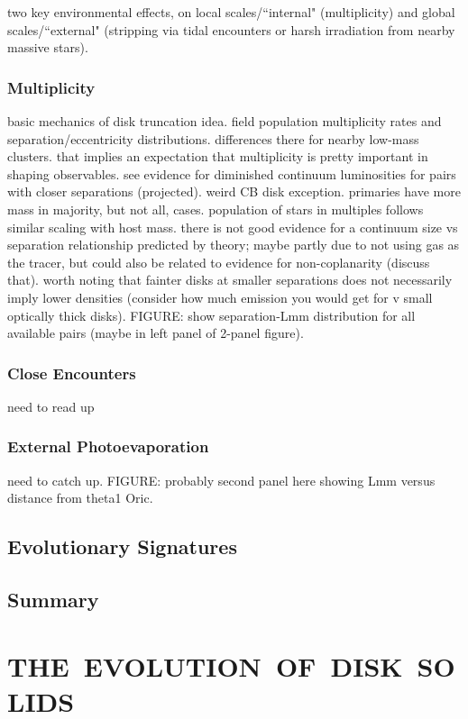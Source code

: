 \documentclass[a4paper]{ar-1col}
\begin{document}
two key environmental effects, on local scales/``internal" (multiplicity) and global scales/``external" (stripping via tidal encounters or harsh irradiation from nearby massive stars).  

\subsubsection{Multiplicity}
basic mechanics of disk truncation idea.  field population multiplicity rates and separation/eccentricity distributions.  differences there for nearby low-mass clusters.  that implies an expectation that multiplicity is pretty important in shaping observables.  see evidence for diminished continuum luminosities for pairs with closer separations (projected).  weird CB disk exception.  primaries have more mass in majority, but not all, cases.  population of stars in multiples follows similar scaling with host mass.  there is not good evidence for a continuum size vs separation relationship predicted by theory; maybe partly due to not using gas as the tracer, but could also be related to evidence for non-coplanarity (discuss that).  worth noting that fainter disks at smaller separations does not necessarily imply lower densities (consider how much emission you would get for v small optically thick disks).  FIGURE: show separation-Lmm distribution for all available pairs (maybe in left panel of 2-panel figure).

\subsubsection{Close Encounters}
need to read up

\subsubsection{External Photoevaporation}
need to catch up.  FIGURE: probably second panel here showing Lmm versus distance from theta1 Oric.



\subsection{Evolutionary Signatures}

\subsection{Summary}


\section{THE\ EVOLUTION\ OF\ DISK\ SOLIDS} \label{sec:solids}
\end{document}

